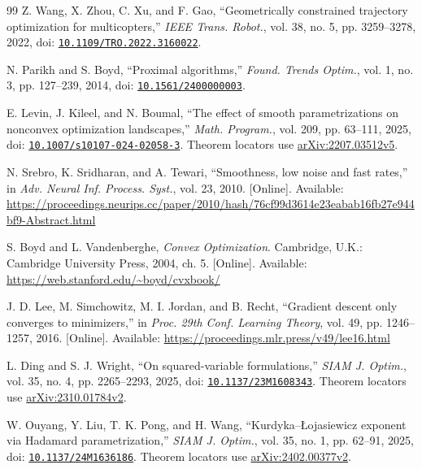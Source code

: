 \documentclass[10pt,a4paper]{article}
\begin{document}
\FloatBarrier
\begin{thebibliography}{99}
 Z. Wang, X. Zhou, C. Xu, and F. Gao, ``Geometrically constrained trajectory optimization for multicopters,'' \emph{IEEE Trans. Robot.}, vol. 38, no. 5, pp. 3259--3278, 2022, doi: \href{https://doi.org/10.1109/TRO.2022.3160022}{\nolinkurl{10.1109/TRO.2022.3160022}}.

 N. Parikh and S. Boyd, ``Proximal algorithms,'' \emph{Found. Trends Optim.}, vol. 1, no. 3, pp. 127--239, 2014, doi: \href{https://doi.org/10.1561/2400000003}{\nolinkurl{10.1561/2400000003}}.

 E. Levin, J. Kileel, and N. Boumal, ``The effect of smooth parametrizations on nonconvex optimization landscapes,'' \emph{Math. Program.}, vol. 209, pp. 63--111, 2025, doi: \href{https://doi.org/10.1007/s10107-024-02058-3}{\nolinkurl{10.1007/s10107-024-02058-3}}. Theorem locators use \href{https://arxiv.org/abs/2207.03512v5}{arXiv:2207.03512v5}.

 N. Srebro, K. Sridharan, and A. Tewari, ``Smoothness, low noise and fast rates,'' in \emph{Adv. Neural Inf. Process. Syst.}, vol. 23, 2010. [Online]. Available: \url{https://proceedings.neurips.cc/paper/2010/hash/76cf99d3614e23eabab16fb27e944bf9-Abstract.html}

 S. Boyd and L. Vandenberghe, \emph{Convex Optimization}. Cambridge, U.K.: Cambridge University Press, 2004, ch. 5. [Online]. Available: \url{https://web.stanford.edu/~boyd/cvxbook/}

 J. D. Lee, M. Simchowitz, M. I. Jordan, and B. Recht, ``Gradient descent only converges to minimizers,'' in \emph{Proc. 29th Conf. Learning Theory}, vol. 49, pp. 1246--1257, 2016. [Online]. Available: \url{https://proceedings.mlr.press/v49/lee16.html}

 L. Ding and S. J. Wright, ``On squared-variable formulations,'' \emph{SIAM J. Optim.}, vol. 35, no. 4, pp. 2265--2293, 2025, doi: \href{https://doi.org/10.1137/23M1608343}{\nolinkurl{10.1137/23M1608343}}. Theorem locators use \href{https://arxiv.org/abs/2310.01784v2}{arXiv:2310.01784v2}.

 W. Ouyang, Y. Liu, T. K. Pong, and H. Wang, ``Kurdyka--\L{}ojasiewicz exponent via Hadamard parametrization,'' \emph{SIAM J. Optim.}, vol. 35, no. 1, pp. 62--91, 2025, doi: \href{https://doi.org/10.1137/24M1636186}{\nolinkurl{10.1137/24M1636186}}. Theorem locators use \href{https://arxiv.org/abs/2402.00377v2}{arXiv:2402.00377v2}.


\end{thebibliography}
\end{document}

